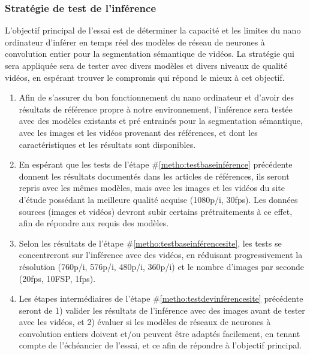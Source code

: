 \subsubsection{Stratégie de test de l'inférence} \label{section:strategie_test_inference}
\par L'objectif principal de l'essai est de déterminer la capacité et les limites du nano ordinateur d'inférer en temps réel des modèles de réseau de neurones à convolution entier pour la segmentation sémantique de vidéos. La stratégie qui sera appliquée sera de tester avec divers modèles et divers niveaux de qualité vidéos, en espérant trouver le compromis qui répond le mieux à cet objectif.
\begin{enumerate}
   \item \label{metho:testbaseinférence} Afin de s'assurer du bon fonctionnement du nano ordinateur et d'avoir des résultats de référence propre à notre environnement, l'inférence sera testée avec des modèles existants et pré entrainés pour la segmentation sémantique, avec les images et les vidéos provenant des références, et dont les caractéristiques et les résultats sont disponibles. 
   \item \label{metho:testbaseinférencesite} En espérant que les tests de l'étape \#\ref{metho:testbaseinférence} précédente donnent les résultats documentés dans les articles de références, ils seront repris avec les mêmes modèles, mais avec les images et les vidéos du site d'étude possédant la meilleure qualité acquise (1080p/i, 30\acrshort{fps}). Les données sources (images et vidéos) devront subir certains prétraitements à ce effet, afin de répondre aux requis des modèles.
   \item \label{metho:testdevinférencesite} Selon les résultats de l'étape \#\ref{metho:testbaseinférencesite}, les tests se concentreront sur l'inférence avec des vidéos, en réduisant progressivement la résolution (760p/i, 576p/i, 480p/i, 360p/i) et le nombre d'images par seconde (20\acrshort{fps}, 10FSP, 1\acrshort{fps}).
   \item Les étapes intermédiaires de l'étape \#\ref{metho:testdevinférencesite} précédente seront de 1) valider les résultats de l'inférence avec des images avant de tester avec les vidéos, et 2) évaluer si les modèles de réseaux de neurones à convolution entiers doivent et/ou peuvent être adaptés facilement, en tenant compte de l'échéancier de l'essai, et ce afin de répondre à l'objectif principal.
\end{enumerate}
